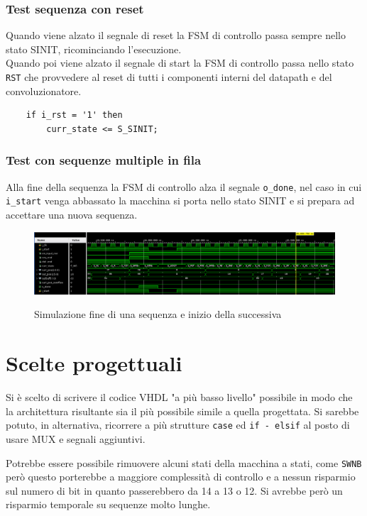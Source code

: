 \documentclass[12pt, a4paper]{article}
\begin{document}

\pagebreak

\vspace{10cm}

\subsubsection{Test sequenza con reset}

Quando viene alzato il segnale di reset la FSM di controllo passa sempre nello stato SINIT, ricominciando l'esecuzione.\\
\noindent Quando poi viene alzato il segnale di start la FSM di controllo passa nello stato \texttt{RST}
che provvedere al reset di tutti i componenti interni del datapath e del convoluzionatore.

\begin{verbatim}
    if i_rst = '1' then
        curr_state <= S_SINIT;
\end{verbatim}

\subsubsection{Test con sequenze multiple in fila}

Alla fine della sequenza la FSM di controllo alza il segnale \texttt{o\_done}, nel caso in cui \texttt{i\_start} venga abbassato
la macchina si porta nello stato SINIT e si prepara ad accettare una nuova sequenza.

\begin{figure}[h!]
    \centering
    \includegraphics[scale=0.3]{sim_mult_seq.png}
    \label{img:sim_multseq_change}
    \caption{Simulazione fine di una sequenza e inizio della successiva}
\end{figure}

\section{Scelte progettuali}

Si è scelto di scrivere il codice VHDL "a più basso livello" possibile in modo
che la architettura risultante sia il più possibile simile a quella progettata.
Si sarebbe potuto, in alternativa, ricorrere a più strutture \texttt{case} ed \texttt{if - elsif} 
al posto di usare MUX e segnali aggiuntivi.

Potrebbe essere possibile rimuovere alcuni stati della macchina a stati, come \texttt{SWNB}
però questo porterebbe a maggiore complessità di controllo e a nessun risparmio sul numero di bit in quanto passerebbero
da 14 a 13 o 12.
Si avrebbe però un risparmio temporale su sequenze molto lunghe.
\end{document}
